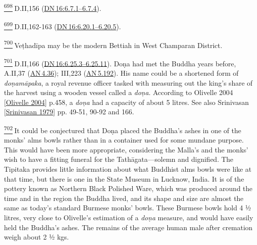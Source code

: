 \label{footprints_split_025.html_fn698}
\hyperref[footprints_split_017.htmlux5cux23fnref698]{\textsuperscript{698}} D.II,156
(\href{https://suttacentral.net/dn16/en/sujato\#6.7.1}{DN\,16:6.7.1--6.7.4}).

\label{footprints_split_025.html_fn699}
\hyperref[footprints_split_018.htmlux5cux23fnref699]{\textsuperscript{699}} D.II,162-163
(\href{https://suttacentral.net/dn16/en/sujato\#6.20.1}{DN\,16:6.20.1--6.20.5}).

\label{footprints_split_025.html_fn700}
\hyperref[footprints_split_018.htmlux5cux23fnref700]{\textsuperscript{700}} Veṭhadīpa
may be the modern Bettiah in West Champaran District.

\label{footprints_split_025.html_fn701}
\hyperref[footprints_split_018.htmlux5cux23fnref701]{\textsuperscript{701}} D.II,166
(\href{https://suttacentral.net/dn16/en/sujato\#6.25.3}{DN\,16:6.25.3--6.25.11}).
Doṇa had met the Buddha years before, A.II,37
(\href{https://suttacentral.net/an4.36/en/sujato}{AN\,4.36}); III,223
(\href{https://suttacentral.net/an5.192/en/sujato}{AN\,5.192}). His name
could be a shortened form of \emph{doṇamāpaka}, a royal revenue officer
tasked with measuring out the king's share of the harvest using a wooden
vessel called a \emph{doṇa}. According to {Olivelle 2004
{{[}\hyperref[footprints_split_022.htmlux5cux23Olivelleux5cux25202004]{Olivelle
2004}{]}}} p.458, a \emph{doṇa} had a capacity of about 5 litres. See
also {Srinivasan
{{[}\hyperref[footprints_split_022.htmlux5cux23Srinivasanux5cux25201979]{Srinivasan
1979}{]}}} pp. 49-51, 90-92 and 166.

\label{footprints_split_025.html_fn702}
\hyperref[footprints_split_018.htmlux5cux23fnref702]{\textsuperscript{702}} It
could be conjectured that Doṇa placed the Buddha's ashes in one of the
monks' alms bowls rather than in a container used for some mundane
purpose. This would have been more appropriate, considering the Malla's
and the monks' wish to have a fitting funeral for the Tathāgata---solemn
and dignified. The Tipitaka provides little information about what
Buddhist alms bowls were like at that time, but there is one in the
State Museum in Lucknow, India. It is of the pottery known as Northern
Black Polished Ware, which was produced around the time and in the
region the Buddha lived, and its shape and size are almost the same as
today's standard Burmese monks' bowls. These Burmese bowls hold 4 ½
litres, very close to Olivelle's estimation of a \emph{doṇa} measure,
and would have easily held the Buddha's ashes. The remains of the
average human male after cremation weigh about 2 ½ kgs.

